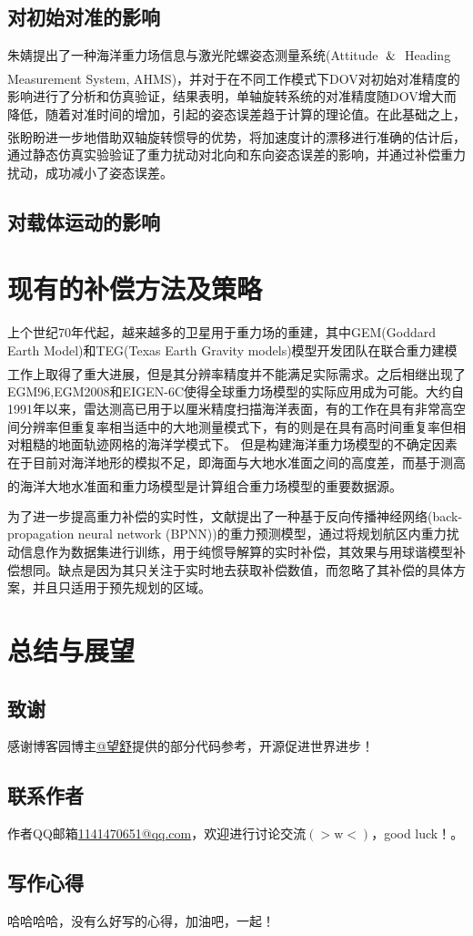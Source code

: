 \documentclass[12pt,a4,utf8]{article}
\newcommand{\upcite}[1]{\textsuperscript{\textsuperscript{\cite{#1}}}} %
\begin{document}
\subsection{对初始对准的影响}
朱婧提出了一种海洋重力场信息与激光陀螺姿态测量系统(Attitude $\And$ Heading Measurement System, AHMS)\upcite{1020386196.nh}，并对于在不同工作模式下DOV对初始对准精度的影响进行了分析和仿真验证，结果表明，单轴旋转系统的对准精度随DOV增大而降低，随着对准时间的增加，引起的姿态误差趋于计算的理论值。在此基础之上，张盼盼进一步地借助双轴旋转惯导的优势\upcite{zhang2023gravity}，将加速度计的漂移进行准确的估计后，通过静态仿真实验验证了重力扰动对北向和东向姿态误差的影响，并通过补偿重力扰动，成功减小了姿态误差。

\subsection{对载体运动的影响}

\section{现有的补偿方法及策略}
上个世纪70年代起，越来越多的卫星用于重力场的重建，其中GEM(Goddard Earth Model)和TEG(Texas Earth Gravity models)模型开发团队在联合重力建模工作上取得了重大进展\upcite{lerch1972gravitational,tapley1997teg}，但是其分辨率精度并不能满足实际需求。之后相继出现了EGM96,EGM2008和EIGEN-6C使得全球重力场模型的实际应用成为可能。大约自1991年以来，雷达测高已用于以厘米精度扫描海洋表面，有的工作在具有非常高空间分辨率但重复率相当适中的大地测量模式下，有的则是在具有高时间重复率但相对粗糙的地面轨迹网格的海洋学模式下。
但是构建海洋重力场模型的不确定因素在于目前对海洋地形的模拟不足，即海面与大地水准面之间的高度差，而基于测高的海洋大地水准面和重力场模型是计算组合重力场模型的重要数据源\upcite{pavlis2012development,flechtner2021satellite}。


为了进一步提高重力补偿的实时性，文献\cite{gao2021real}提出了一种基于反向传播神经网络(back-propagation neural network (BPNN))的重力预测模型，通过将规划航区内重力扰动信息作为数据集进行训练，用于纯惯导解算的实时补偿，其效果与用球谐模型补偿想同。缺点是因为其只关注于实时地去获取补偿数值，而忽略了其补偿的具体方案，并且只适用于预先规划的区域。
\section{总结与展望}


\newpage
\subsection{致谢}
感谢博客园博主\href{https://www.cnblogs.com/huangliu1111/p/13625826.html}{@望舒}提供的部分代码参考，开源促进世界进步！
\subsection{联系作者}
作者QQ邮箱\href{https://wx.mail.qq.com/?cancel_login=true&from=get_ticket_fail}{1141470651@qq.com}，欢迎进行讨论交流$(>\text{w}<)$，good luck！。

\subsection{写作心得}
哈哈哈哈，没有么好写的心得，加油吧，一起！

\end{document}
